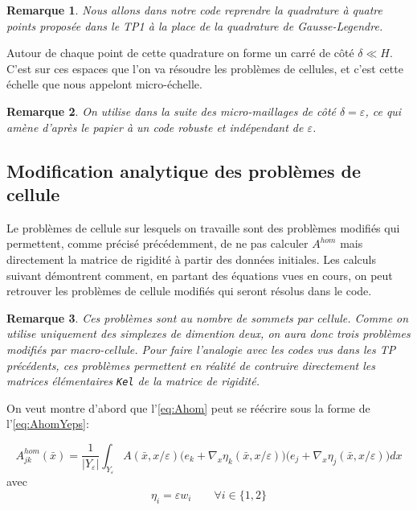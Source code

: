 \documentclass[11pt]{article}
\newtheorem{rmq}{Remarque}
\newcommand{\Ah}{A^{hom}}
\newcommand{\bx}{\bar{x}}
\newcommand{\Ye}{Y_\varepsilon}
\begin{document}
\begin{rmq}
  Nous allons dans notre code reprendre la quadrature à quatre points proposée dans le TP1 à la place de la quadrature de Gausse-Legendre.
\end{rmq}

Autour de chaque point de cette quadrature on forme un carré de côté $\delta \ll H$. C'est sur ces espaces que l'on va résoudre les problèmes de
cellules, et c'est cette échelle que nous appelont micro-échelle.

\begin{rmq}
  On utilise dans la suite des micro-maillages de côté $\delta = \varepsilon$, ce qui amène d'après le papier à un code robuste et indépendant de
  $\varepsilon$. 
\end{rmq}


\subsection{Modification analytique des problèmes de cellule}

Le problèmes de cellule sur lesquels on travaille sont des problèmes modifiés qui permettent, comme précisé précédemment, de ne pas calculer $\Ah$ mais
directement la matrice de rigidité à partir des données initiales. Les calculs suivant démontrent comment, en partant des équations vues en cours, on
peut retrouver les problèmes de cellule modifiés qui seront résolus dans le code.

\begin{rmq}
  Ces problèmes sont au nombre de sommets par cellule. Comme on utilise uniquement des simplexes de dimention deux, on aura donc trois problèmes
  modifiés par macro-cellule. Pour faire l'analogie avec les codes vus dans les TP précédents, ces problèmes permettent en réalité de contruire
  directement les matrices élémentaires \texttt{Kel} de la matrice de rigidité.
\end{rmq}

On veut montre d'abord que l'\autoref{eq:Ahom} peut se réécrire sous la forme de l'\autoref{eq:AhomYeps}:

\begin{equation}
  \label{eq:AhomYeps}
  \Ah_{jk}(\bx) = \frac{1}{|\Ye|}
  \int_{\Ye} A(\bx, x/\varepsilon) \big(e_k+\nabla_x \eta_k(\bx, x/\varepsilon)\big)\big(e_j+\nabla_x \eta_j(\bx, x/\varepsilon)\big) dx
\end{equation}
avec 
\[
  \eta_i = \varepsilon w_i \qquad \forall i \in \{1,2\}
\]
\end{document}

